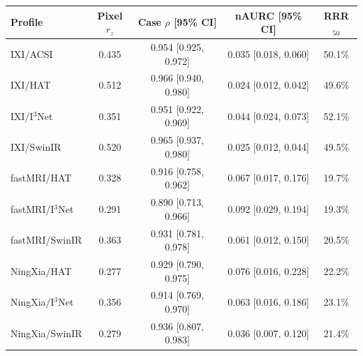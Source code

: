 \begin{tabular}{lcccc}
\toprule
Profile & Pixel $r_z$ & Case $\rho$ [95\% CI] & nAURC [95\% CI] & RRR$_{50}$ \\
\midrule
IXI/ACSI & 0.435 & 0.954 [0.925, 0.972] & 0.035 [0.018, 0.060] & 50.1\% \\
IXI/HAT & 0.512 & 0.966 [0.940, 0.980] & 0.024 [0.012, 0.042] & 49.6\% \\
IXI/I$^3$Net & 0.351 & 0.951 [0.922, 0.969] & 0.044 [0.024, 0.073] & 52.1\% \\
IXI/SwinIR & 0.520 & 0.965 [0.937, 0.980] & 0.025 [0.012, 0.044] & 49.5\% \\
\midrule
fastMRI/HAT & 0.328 & 0.916 [0.758, 0.962] & 0.067 [0.017, 0.176] & 19.7\% \\
fastMRI/I$^3$Net & 0.291 & 0.890 [0.713, 0.966] & 0.092 [0.029, 0.194] & 19.3\% \\
fastMRI/SwinIR & 0.363 & 0.931 [0.781, 0.978] & 0.061 [0.012, 0.150] & 20.5\% \\
\midrule
NingXia/HAT & 0.277 & 0.929 [0.790, 0.975] & 0.076 [0.016, 0.228] & 22.2\% \\
NingXia/I$^3$Net & 0.356 & 0.914 [0.769, 0.970] & 0.063 [0.016, 0.186] & 23.1\% \\
NingXia/SwinIR & 0.279 & 0.936 [0.807, 0.983] & 0.036 [0.007, 0.120] & 21.4\% \\
\bottomrule
\end{tabular}
